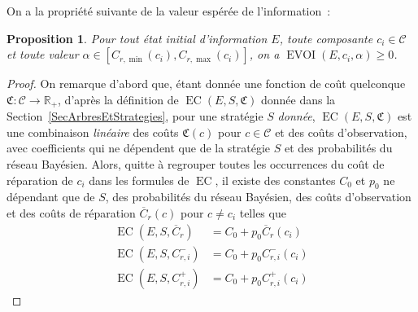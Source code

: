 \documentclass[a4paper,11pt]{article}
\theoremstyle{plain}
\newtheorem*{prop}{Proposition}
\theoremstyle{definition}
\DeclareMathOperator{\EC}{EC}
\DeclareMathOperator{\EVOI}{EVOI}
\begin{document}
On a la propriété suivante de la valeur espérée de l'information~:

\begin{prop}
Pour tout état initial d'information $E$, toute composante $c_i \in \mathcal C$ et toute valeur $\alpha \in [C_{r, \min}(c_i), C_{r, \max}(c_i)]$, on a $\EVOI(E, c_i, \alpha) \geq 0$.
\end{prop}

\begin{proof}
On remarque d'abord que, étant donnée une fonction de coût quelconque $\mathfrak C: \mathcal C \to \mathbb R_+$, d'après la définition de $\EC(E, S, \mathfrak C)$ donnée dans la Section~\ref{SecArbresEtStrategies}, pour une stratégie $S$ \emph{donnée}, $\EC(E, S, \mathfrak C)$ est une combinaison \emph{linéaire} des coûts $\mathfrak C(c)$ pour $c \in \mathcal C$ et des coûts d'observation, avec coefficients qui ne dépendent que de la stratégie $S$ et des probabilités du réseau Bayésien. Alors, quitte à regrouper toutes les occurrences du coût de réparation de $c_i$ dans les formules de $\EC$, il existe des constantes $C_0$ et $p_0$ ne dépendant que de $S$, des probabilités du réseau Bayésien, des coûts d'observation et des coûts de réparation $\overline C_r(c)$ pour $c \neq c_i$ telles que
\begin{equation}
\label{EqECs}
\begin{aligned}
\EC(E, S, \overline C_r) & = C_0 + p_0 \overline C_r(c_i) \\
\EC(E, S, C_{r, i}^-) & = C_0 + p_0 C_{r, i}^-(c_i) \\
\EC(E, S, C_{r, i}^+) & = C_0 + p_0 C_{r, i}^+ (c_i)
\end{aligned}
\end{equation}


\end{proof}
\end{document}
